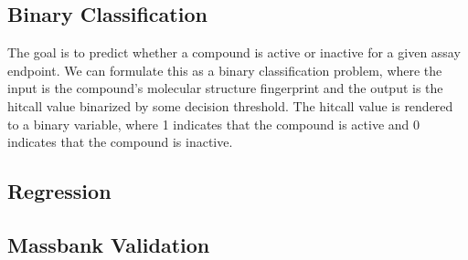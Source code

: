 \subsection{Binary Classification}
The goal is to predict whether a compound is active or inactive for a given assay endpoint. We can formulate this as a binary classification problem, where the input is the compound's molecular structure fingerprint and the output is the hitcall value binarized by some decision threshold. The hitcall value is rendered to a binary variable, where 1 indicates that the compound is active and 0 indicates that the compound is inactive.
\subsection{Regression}
\subsection{Massbank Validation}
